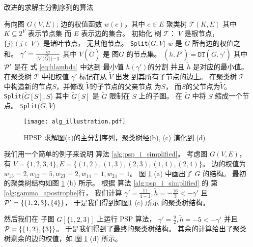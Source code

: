 \begin{algorithm}[!ht]
	\caption{改进的求解主分割序列的算法}\label{alg:psp_i_simplified}
	\begin{algorithmic}[1]
		\REQUIRE 有向图 $G(V, E)$; 边的权值函数 $w(e)$，其中 $e\in E$
		\ENSURE 聚类树 $\mathcal{T}(K, E)$ 其中 $K \subseteq 2^{V}$ 表示节点集
    而 $E$ 表示边的集合。
		\STATE 初始化 树 $\mathcal{T}$：
     $V$ 是根节点，
     $\{j\}(j \in V)$ 是诸叶节点，
     无其他节点。
		\STATE \texttt{Split}($G, V$)
		\STATE $w$ 是 $\widetilde{G}$ 所有边的权值之和。
		\STATE $\gamma' = \frac{w}{\abs{V(\widetilde{G})}-1}$
    其中 $V(\widetilde{G})$ 是 图$\widetilde{G}$
    的节点集。
    \label{alg:gamma_apostrophe}
		\STATE $(\tilde{h}, P') = \texttt{DT}(\widetilde{G}, \gamma')$ 其中
    $\P'$ 是在 式 \eqref{eq:hlambda} 中达到
    最小值 $h(\gamma')$的分割
    并且 $\tilde{h}$ 是对应的最小值。 \label{line:DT}
		\STATE 在聚类树
    $\mathcal{T}$ 中把权值 $\gamma'$ 标记在从 $\widetilde{V}$ 出发
    到其所有子节点的边上。
		\ELSE
		\STATE 在聚类树
    $\mathcal{T}$ 中构造新的节点$S$，并修改 $\widetilde{V}$的子节点的父亲节点 为$S$，
    而$S$的父节点为$\widetilde{V}$。
		\STATE \texttt{Split}($\widetilde{G}[S], S$)
    其中 $\widetilde{G}[S]$ 是 $\widetilde{G}$ 限制在 $S$
    上的子图。\label{line:SplitDown}
		\STATE 在 $\widetilde{G}$ 中将 $S$ 缩成一个节点。 %
		\ENDFOR 
		\STATE \texttt{Split}($\widetilde{G}, \widetilde{V}$)		\label{line:SplitUp}
		\ENDIF
		\ENDFUNCTION
	\end{algorithmic}
\end{algorithm}

\begin{figure}[!ht]
	\centering
	\texttt{[image: alg\_illustration.pdf]}
	\caption{HPSP 求解图(a)的主分割序列，聚类树经(b), (c) 演化到 (d) }\label{fig:alg_eg}
\end{figure}

\begin{example}
	我们用一个简单的例子来说明
  算法 \ref{alg:psp_i_simplified}。
  考虑图 $G(V, E)$，有 $V=\{1,2,3,4\}, E=\{(1,2),(1,3),(2,3),(1,4),(2,4)\}$。
  边的权值为 $w_{13}=2, w_{12}=5, w_{23}=2, w_{14}=1, w_{24}=1$。
	图 \ref{fig:alg_eg} (a) 中画出了 $G$
  的结构。
  最初的聚类树结构如图 \ref{fig:alg_eg} (b)
  所示。
  根据 
  算法 \ref{alg:psp_i_simplified} 的
  第\ref {alg:gamma_apostrophe}行，
  我们计算 $\gamma' = \frac{11}{4-1}, \tilde{h} = -\frac{16}{3} < -\gamma' $
  且 $\P' = \{\{1,2,3\},\{4\}\}$，
  于是我们得到如图\ref{fig:alg_eg} (c) 所示
  的聚类树结构。
	
	然后我们在 子图 $G[\{1,2,3\}]$ 上运行 PSP 算法，
  $\gamma' = \frac{9}{2}, \tilde{h} = -5 < -\gamma'$
  并且 $\P= \{\{1,2\},\{3\}\}$。 
  于是我们得到了最终的聚类树结构。
  其余的计算给出了聚类树剩余的边的权值，如
  图 \ref{fig:alg_eg} (d) 所示。
\end{example}	
